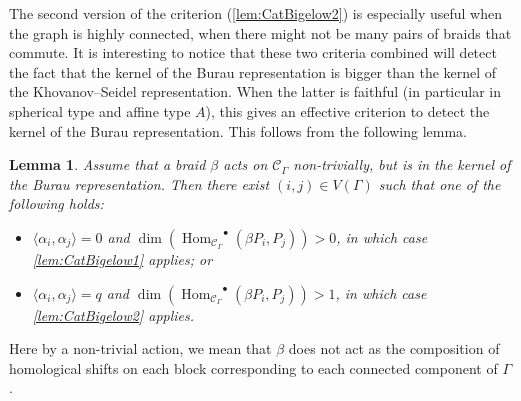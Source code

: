 \documentclass[a4paper]{amsart}
\newcommand{\0}{\mathbf{0}}
\DeclareMathOperator{\Hom}{Hom}
\newcommand{\HOM}{\ensuremath{\Hom_{\mathcal{C}_\Gamma}}}
\theoremstyle{theorem}
\newtheorem{lemma}[theorem]{Lemma}
\begin{document}
The second version of the criterion (\cref{lem:CatBigelow2}) is especially useful when the graph is highly connected, when there might not be many pairs of braids that commute.
It is interesting to notice that these two criteria combined will detect the fact that the kernel of the Burau representation is bigger than the kernel of the Khovanov--Seidel representation.
When the latter is faithful (in particular in spherical type and affine type \(A\)), this gives an effective criterion to detect the kernel of the Burau representation. This follows from the following lemma.

\begin{lemma} \label{lem:equivalence}
  Assume that a braid $\beta$ acts on $\mathcal{C}_{\Gamma}$ non-trivially, but is in the kernel of the Burau representation. Then there exist $(i,j)\in V(\Gamma)$ such that one of the following holds:
  \begin{itemize}
  \item $\langle \alpha_i,\alpha_j\rangle =0$ and $\dim(\HOM^{\bullet}(\beta P_i,P_j))>0$, in which case \cref{lem:CatBigelow1} applies; or 
  \item $\langle \alpha_i,\alpha_j\rangle=q$ and $\dim(\HOM^{\bullet}(\beta P_i,P_j))>1$, in which case \cref{lem:CatBigelow2} applies.
  \end{itemize}
\end{lemma}

Here by a non-trivial action, we mean that $\beta$ does not act as the composition of homological shifts on each block corresponding to each connected component of $\Gamma$.
\end{document}
